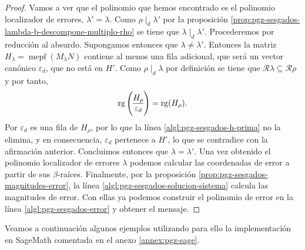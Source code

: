 \begin{proof}
  Vamos a ver que el polinomio que hemos encontrado es el polinomio localizador de errores, \(\lambda' = \lambda\).
  Como \(\rho \mid_d \lambda'\) por la proposición \ref{prop:pgz-sesgados-lambda-b-descompone-multiplo-rho} se tiene que \(\lambda \mid_d \lambda'\).
  Procederemos por reducción al absurdo.
  Supongamos entonces que \(\lambda \neq \lambda'\).
  Entonces la matriz \(H_{\lambda} = \operatorname{mepf}(M_{\lambda}N)\) contiene al menos una fila adicional, que será un vector canónico \(\varepsilon_{d}\), que no está en \(H'\).
  Como \(\rho \mid_d \lambda\) por definición se tiene que \(\mathcal R\lambda \subseteq \mathcal R\rho\) y por tanto,
  \[
    \rank\left( \begin{array}{@{}c@{}}
      H_{\rho}\\\hline
      \varepsilon_{d}
    \end{array}\right) = \rank (H_{\rho}).
  \]
  Por \parencite[Lema 2.4]{gomez-torrecillas_petersongorensteinzierler_2018} \(\varepsilon_{d}\) es una fila de \(H_{\rho}\), por lo que la línea \ref{algl:pgz-sesgados-h-prima} no la elimina, y en consecuencia, \(\varepsilon_{d}\) pertenece a \(H'\), lo que se contradice con la afirmación anterior.
  Concluimos entonces que \(\lambda = \lambda'\).
  Una vez obtenido el polinomio localizador de errores \(\lambda\) podemos calcular las coordenadas de error a partir de sus \(\beta\)-raíces.
  Finalmente, por la proposición \ref{prop:pgz-sesgados-magnitudes-error}, la línea \ref{algl:pgz-sesgados-solucion-sistema} calcula las magnitudes de error.
  Con ellas ya podemos construir el polinomio de error en la línea \ref{algl:pgz-sesgados-error} y obtener el mensaje.
\end{proof}

Veamos a continuación algunos ejemplos utilizando para ello la implementación en SageMath comentada en el anexo \ref{annex:pgz-sage}.

